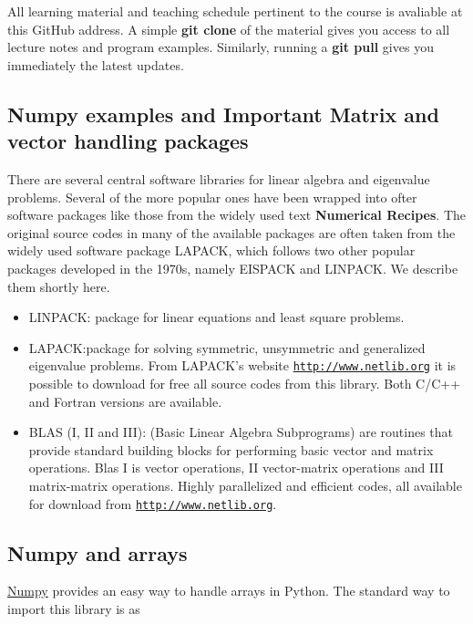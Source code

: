 \documentclass[%
oneside,                 %
final,                   %
10pt]{article}
\begin{document}
\noindent
All learning material and teaching schedule pertinent to the course is
avaliable at this GitHub address. A simple \textbf{git clone} of the material
gives you access to all lecture notes and program examples. Similarly,
running a \textbf{git pull} gives you immediately the latest updates.

\subsection{Numpy examples and Important Matrix and vector handling packages}

There are several central software libraries for linear algebra and eigenvalue problems. Several of the more
popular ones have been wrapped into ofter software packages like those from the widely used text \textbf{Numerical Recipes}. The original source codes in many of the available packages are often taken from the widely used
software package LAPACK, which follows two other popular packages
developed in the 1970s, namely EISPACK and LINPACK.  We describe them shortly here.

\begin{itemize}
  \item LINPACK: package for linear equations and least square problems.

  \item LAPACK:package for solving symmetric, unsymmetric and generalized eigenvalue problems. From LAPACK's website \href{{http://www.netlib.org}}{\nolinkurl{http://www.netlib.org}} it is possible to download for free all source codes from this library. Both C/C++ and Fortran versions are available.

  \item BLAS (I, II and III): (Basic Linear Algebra Subprograms) are routines that provide standard building blocks for performing basic vector and matrix operations. Blas I is vector operations, II vector-matrix operations and III matrix-matrix operations. Highly parallelized and efficient codes, all available for download from \href{{http://www.netlib.org}}{\nolinkurl{http://www.netlib.org}}.
\end{itemize}

\noindent
\subsection{Numpy and arrays}
\href{{http://www.numpy.org/}}{Numpy} provides an easy way to handle arrays in Python. The standard way to import this library is as
\end{document}
